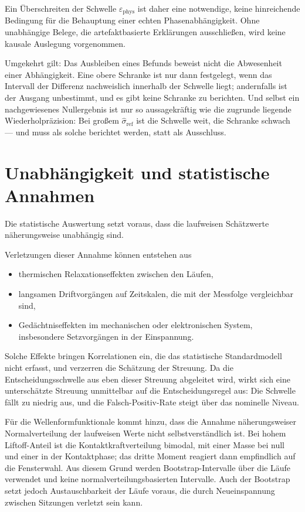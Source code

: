 \documentclass[12pt,a4paper]{report}
\begin{document}
Ein Überschreiten der Schwelle $\varepsilon_{\mathrm{phys}}$ ist daher
eine notwendige, keine hinreichende Bedingung für die Behauptung einer
echten Phasenabhängigkeit. Ohne unabhängige Belege, die
artefaktbasierte Erklärungen ausschließen, wird keine kausale Auslegung
vorgenommen.

Umgekehrt gilt: Das Ausbleiben eines Befunds beweist nicht die
Abwesenheit einer Abhängigkeit. Eine obere Schranke ist nur dann
festgelegt, wenn das Intervall der Differenz nachweislich innerhalb der
Schwelle liegt; andernfalls ist der Ausgang unbestimmt, und es gibt
keine Schranke zu berichten. Und selbst ein nachgewiesenes
Nullergebnis ist nur so aussagekräftig wie die zugrunde liegende
Wiederholpräzision: Bei großem $\hat{\sigma}_{\mathrm{ref}}$ ist die
Schwelle weit, die Schranke schwach --- und muss als solche berichtet
werden, statt als Ausschluss.

\section{Unabhängigkeit und statistische Annahmen}

Die statistische Auswertung setzt voraus, dass die laufweisen Schätzwerte
näherungsweise unabhängig sind.

Verletzungen dieser Annahme können entstehen aus

\begin{itemize}
    \item thermischen Relaxationseffekten zwischen den Läufen,
    \item langsamen Driftvorgängen auf Zeitskalen, die mit der Messfolge
    vergleichbar sind,
    \item Gedächtniseffekten im mechanischen oder elektronischen System,
    insbesondere Setzvorgängen in der Einspannung.
\end{itemize}

Solche Effekte bringen Korrelationen ein, die das statistische
Standardmodell nicht erfasst, und verzerren die Schätzung der Streuung.
Da die Entscheidungsschwelle aus eben dieser Streuung abgeleitet wird,
wirkt sich eine unterschätzte Streuung unmittelbar auf die
Entscheidungsregel aus: Die Schwelle fällt zu niedrig aus, und die
Falsch-Positiv-Rate steigt über das nominelle Niveau.

Für die Wellenformfunktionale kommt hinzu, dass die Annahme
näherungsweiser Normalverteilung der laufweisen Werte nicht
selbstverständlich ist. Bei hohem Liftoff-Anteil ist die
Kontaktkraftverteilung bimodal, mit einer Masse bei null und einer in der
Kontaktphase; das dritte Moment reagiert dann empfindlich auf die
Fensterwahl. Aus diesem Grund werden Bootstrap-Intervalle über die Läufe
verwendet und keine normalverteilungsbasierten Intervalle. Auch der
Bootstrap setzt jedoch Austauschbarkeit der Läufe voraus, die durch
Neueinspannung zwischen Sitzungen verletzt sein kann.
\end{document}
